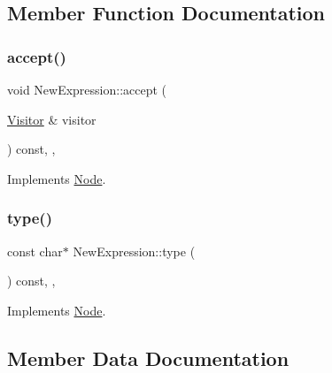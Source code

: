\subsection{Member Function Documentation}
\mbox{\label{struct_new_expression_a02f3b4798c1351cee31f27d0cbf6346f}} 
\subsubsection{\texorpdfstring{accept()}{accept()}}
{\footnotesize\ttfamily void New\+Expression\+::accept (\begin{DoxyParamCaption}\item[{\hyperlink{struct_visitor}{Visitor} \&}]{visitor }\end{DoxyParamCaption}) const\hspace{0.3cm}{\ttfamily [inline]}, {\ttfamily [override]}, {\ttfamily [virtual]}}



Implements \hyperlink{struct_node_a10bd7af968140bbf5fa461298a969c71}{Node}.

\mbox{\label{struct_new_expression_a30486948a74f6c149f0c8a05b580b360}} 
\subsubsection{\texorpdfstring{type()}{type()}}
{\footnotesize\ttfamily const char$\ast$ New\+Expression\+::type (\begin{DoxyParamCaption}{ }\end{DoxyParamCaption}) const\hspace{0.3cm}{\ttfamily [inline]}, {\ttfamily [override]}, {\ttfamily [virtual]}}



Implements \hyperlink{struct_node_a82f29420d0a38efcc370352528e94e9b}{Node}.



\subsection{Member Data Documentation}
\mbox{\label{struct_new_expression_a4d43c4128966ccb728f92a0204d04eaa}} 
